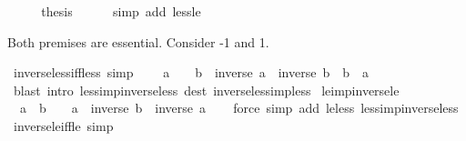 \begin{isabellebody}
\ \ \isamarkupfalse%
\ \isamarkupfalse%
\ {\isacharquery}{\kern0pt}thesis\isanewline
\ \ \ \ \isamarkupfalse%
\ {\isacharparenleft}{\kern0pt}simp\ add{\isacharcolon}{\kern0pt}\ less{\isacharunderscore}{\kern0pt}le{\isacharparenright}{\kern0pt}\isanewline
{}\isamarkupfalse%
%
\endisatagproof
{\isafoldproof}%
%
\isadelimproof
%
\endisadelimproof
%
\begin{isamarkuptext}%
Both premises are essential. Consider -1 and 1.%
\end{isamarkuptext}\isamarkuptrue%
\isamarkupfalse%
\ inverse{\isacharunderscore}{\kern0pt}less{\isacharunderscore}{\kern0pt}iff{\isacharunderscore}{\kern0pt}less\ {\isacharbrackleft}{\kern0pt}simp{\isacharbrackright}{\kern0pt}{\isacharcolon}{\kern0pt}\isanewline
\ \ {\isachardoublequoteopen}{}\ {\isacharless}{\kern0pt}\ a\ {\isasymLongrightarrow}\ {}\ {\isacharless}{\kern0pt}\ b\ {\isasymLongrightarrow}\ inverse\ a\ {\isacharless}{\kern0pt}\ inverse\ b\ {\isasymlongleftrightarrow}\ b\ {\isacharless}{\kern0pt}\ a{\isachardoublequoteclose}\isanewline
%
\isadelimproof
\ \ %
\endisadelimproof
%
\isatagproof
{}\isamarkupfalse%
\ {\isacharparenleft}{\kern0pt}blast\ intro{\isacharcolon}{\kern0pt}\ less{\isacharunderscore}{\kern0pt}imp{\isacharunderscore}{\kern0pt}inverse{\isacharunderscore}{\kern0pt}less\ dest{\isacharcolon}{\kern0pt}\ inverse{\isacharunderscore}{\kern0pt}less{\isacharunderscore}{\kern0pt}imp{\isacharunderscore}{\kern0pt}less{\isacharparenright}{\kern0pt}%
\endisatagproof
{\isafoldproof}%
%
\isadelimproof
\isanewline
%
\endisadelimproof
\isanewline
{}\isamarkupfalse%
\ le{\isacharunderscore}{\kern0pt}imp{\isacharunderscore}{\kern0pt}inverse{\isacharunderscore}{\kern0pt}le{\isacharcolon}{\kern0pt}\isanewline
\ \ {\isachardoublequoteopen}a\ {\isasymle}\ b\ {\isasymLongrightarrow}\ {}\ {\isacharless}{\kern0pt}\ a\ {\isasymLongrightarrow}\ inverse\ b\ {\isasymle}\ inverse\ a{\isachardoublequoteclose}\isanewline
%
\isadelimproof
\ \ %
\endisadelimproof
%
\isatagproof
{}\isamarkupfalse%
\ {\isacharparenleft}{\kern0pt}force\ simp\ add{\isacharcolon}{\kern0pt}\ le{\isacharunderscore}{\kern0pt}less\ less{\isacharunderscore}{\kern0pt}imp{\isacharunderscore}{\kern0pt}inverse{\isacharunderscore}{\kern0pt}less{\isacharparenright}{\kern0pt}%
\endisatagproof
{\isafoldproof}%
%
\isadelimproof
\isanewline
%
\endisadelimproof
\isanewline
{}\isamarkupfalse%
\ inverse{\isacharunderscore}{\kern0pt}le{\isacharunderscore}{\kern0pt}iff{\isacharunderscore}{\kern0pt}le\ {\isacharbrackleft}{\kern0pt}simp{\isacharbrackright}{\kern0pt}{\isacharcolon}{\kern0pt}\isanewline

\end{isabellebody}

